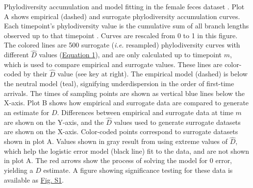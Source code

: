 \documentclass{article}
\begin{document}
{Phylodiversity accumulation and model fitting in the female feces dataset \cite{Caporaso2011}. Plot A shows empirical (dashed) and surrogate phylodiversity accumulation curves. Each timepoint's phylodiversity value is the cumulative sum of all branch lengths observed up to that timepoint \cite{Faith1992}. Curves are rescaled from 0 to 1 in this figure. The colored lines are 500 surrogate (\emph{i.e.} resampled) phylodiversity curves with different \(\hat{D}\) values (\hyperref[sec:equation1]{Equation 1}), and are only calculated up to timepoint \(m\), which is used to compare empirical and surrogate values. These lines are color-coded by their \(\hat{D}\) value (see key at right). The empirical model (dashed) is below the neutral model (teal), signifying underdispersion in the order of first-time arrivals. The times of sampling points are shown as vertical blue lines below the X-axis. Plot B shows how empirical and surrogate data are compared to generate an estimate for \(D\). Differences between empirical and surrogate data at time \(m\) are shown on the Y-axis, and the \(\hat{D}\) values used to generate surrogate datasets are shown on the X-axis. Color-coded points correspond to surrogate datasets shown in plot A. Values shown in gray result from using extreme values of \(\hat{D}\), which help the logistic error model (black line) fit to the data, and are not shown in plot A. The red arrows show the process of solving the model for 0 error, yielding a \(D\) estimate. A figure showing significance testing for these data is available as \hyperref[sec:figureS1]{Fig. S1}.
\newpage

}
\end{document}
